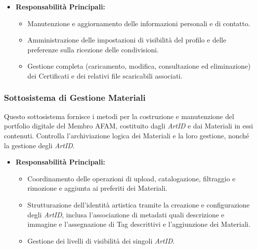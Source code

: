 \begin{itemize}
    \item \textbf{Responsabilità Principali:}
    \begin{itemize}[noitemsep]
        \item Manutenzione e aggiornamento delle informazioni personali e di contatto.
        \item Amministrazione delle impostazioni di visibilità del profilo e delle preferenze sulla ricezione delle condivisioni.
        \item Gestione completa (caricamento, modifica, consultazione ed eliminazione) dei Certificati e dei relativi file scaricabili associati.
    \end{itemize}
\end{itemize}

\subsubsection{Sottosistema di Gestione Materiali}
Questo sottosistema fornisce i metodi per la costruzione e manutenzione del portfolio digitale del Membro AFAM, costituito dagli \textit{ArtID} e dai Materiali in essi contenuti. Controlla l'archiviazione logica dei Materiali e la loro gestione, nonché la gestione degli \textit{ArtID}.

\begin{itemize}
    \item \textbf{Responsabilità Principali:}
    \begin{itemize}[noitemsep]
        \item Coordinamento delle operazioni di upload, catalogazione, filtraggio e rimozione e aggiunta ai preferiti dei Materiali.
        \item Strutturazione dell'identità artistica tramite la creazione e configurazione degli \textit{ArtID}, inclusa l'associazione di metadati quali descrizione e immagine e l'assegnazione di Tag descrittivi e l'aggiunzione dei Materiali.
        \item Gestione dei livelli di visibilità dei singoli \textit{ArtID}.
    \end{itemize}
\end{itemize}

